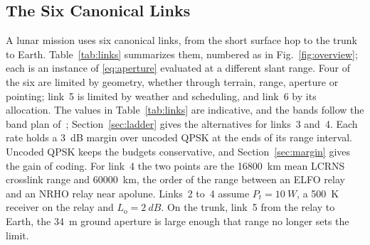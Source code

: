 \documentclass{IEEEoj}
\begin{document}
\subsection{The Six Canonical Links}
\label{sec:sixlinks}
A lunar mission uses six canonical links, from the short surface hop to the trunk to Earth. Table~\ref{tab:links} summarizes them, numbered as in Fig.~\ref{fig:overview}; each is an instance of \eqref{eq:aperture} evaluated at a different slant range. Four of the six are limited by geometry, whether through terrain, range, aperture or pointing; link~5 is limited by weather and scheduling, and link~6 by its allocation. The values in Table~\ref{tab:links} are indicative, and the bands follow the band plan of~\cite{sfcg_rec32}; Section~\ref{sec:ladder} gives the alternatives for links~3 and~4. Each rate holds a \SI{3}{dB} margin over uncoded QPSK at the ends of its range interval. Uncoded QPSK keeps the budgets conservative, and Section~\ref{sec:margin} gives the gain of coding. For link~4 the two points are the \SI{16800}{km} mean LCRNS crosslink range and \SI{60000}{km}, the order of the range between an ELFO relay and an NRHO relay near apolune. Links~2 to~4 assume $P_t = \SI{10}{W}$, a \SI{500}{K} receiver on the relay and $L_{\mathrm{o}} = \SI{2}{dB}$. On the trunk, link~5 from the relay to Earth, the \SI{34}{m} ground aperture is large enough that range no longer sets the limit.
\end{document}

